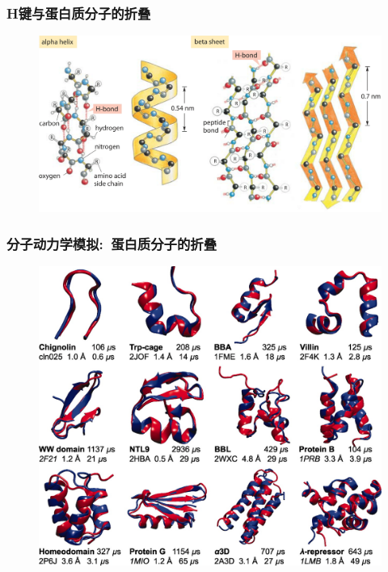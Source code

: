 \frame
{
	\frametitle{\textrm{H}键与蛋白质分子的折叠}
\begin{figure}[h!]
\centering
\vspace{-5.5pt}
\includegraphics[height=0.57\textwidth,width=1.0\textwidth,viewport=0 0 1100 600,clip]{Figures/310-f1-AlphaBeta-1.png}
\label{Protein-structure-2}
\end{figure}
}

%
\frame
{
	\frametitle{分子动力学模拟:~蛋白质分子的折叠}
\begin{figure}[h!]
\centering
\vspace{-13.5pt}
\includegraphics[height=0.75\textwidth,width=1.0\textwidth,viewport=0 0 1290 1130,clip]{Figures/Protein-folding.jpeg}
\label{Protein-folding_2}
\end{figure}
}

